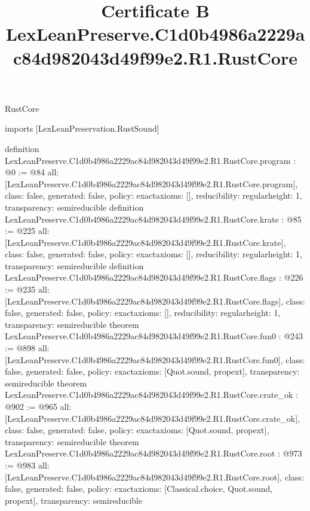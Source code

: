 \begin{lexlean}{RustCore}
\title{Certificate B LexLeanPreserve.C1d0b4986a2229ac84d982043d49f99e2.R1.RustCore}
\begin{coremodule}
imports [LexLeanPreservation.RustSound]

definition LexLeanPreserve.C1d0b4986a2229ac84d982043d49f99e2.R1.RustCore.program : @0 := @84 {
  all: [LexLeanPreserve.C1d0b4986a2229ac84d982043d49f99e2.R1.RustCore.program],
  class: false,
  generated: false,
  policy: exact{axioms: []},
  reducibility: regular{height: 1},
  transparency: semireducible
}
definition LexLeanPreserve.C1d0b4986a2229ac84d982043d49f99e2.R1.RustCore.krate : @85 := @225 {
  all: [LexLeanPreserve.C1d0b4986a2229ac84d982043d49f99e2.R1.RustCore.krate],
  class: false,
  generated: false,
  policy: exact{axioms: []},
  reducibility: regular{height: 1},
  transparency: semireducible
}
definition LexLeanPreserve.C1d0b4986a2229ac84d982043d49f99e2.R1.RustCore.flags : @226 := @235 {
  all: [LexLeanPreserve.C1d0b4986a2229ac84d982043d49f99e2.R1.RustCore.flags],
  class: false,
  generated: false,
  policy: exact{axioms: []},
  reducibility: regular{height: 1},
  transparency: semireducible
}
theorem LexLeanPreserve.C1d0b4986a2229ac84d982043d49f99e2.R1.RustCore.fun0 : @243 := @898 {
  all: [LexLeanPreserve.C1d0b4986a2229ac84d982043d49f99e2.R1.RustCore.fun0],
  class: false,
  generated: false,
  policy: exact{axioms: [Quot.sound, propext]},
  transparency: semireducible
}
theorem LexLeanPreserve.C1d0b4986a2229ac84d982043d49f99e2.R1.RustCore.crate_ok : @902 := @965 {
  all: [LexLeanPreserve.C1d0b4986a2229ac84d982043d49f99e2.R1.RustCore.crate_ok],
  class: false,
  generated: false,
  policy: exact{axioms: [Quot.sound, propext]},
  transparency: semireducible
}
theorem LexLeanPreserve.C1d0b4986a2229ac84d982043d49f99e2.R1.RustCore.root : @973 := @983 {
  all: [LexLeanPreserve.C1d0b4986a2229ac84d982043d49f99e2.R1.RustCore.root],
  class: false,
  generated: false,
  policy: exact{axioms: [Classical.choice, Quot.sound, propext]},
  transparency: semireducible
}


\end{coremodule}
\end{lexlean}
